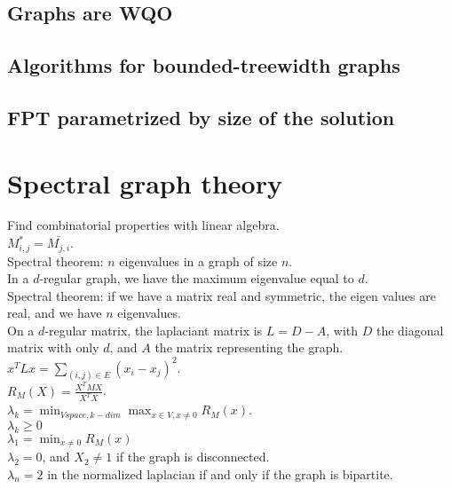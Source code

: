 \documentclass[12pt,a4paper]{article}
\begin{document}
\subsection{Graphs are WQO}
\subsection{Algorithms for bounded-treewidth graphs}
\subsection{FPT parametrized by size of the solution}


\section{Spectral graph theory}

Find combinatorial properties with linear algebra.\\

$M^*_{i,j} = \bar{M_{j,i}}$.\\

Spectral theorem: $n$ eigenvalues in a graph of size $n$.\\

In a $d$-regular graph, we have the maximum eigenvalue equal to $d$.\\

Spectral theorem: if we have a matrix real and symmetric, the eigen values are
real, and we have $n$ eigenvalues.\\

On a $d$-regular matrix, the laplaciant matrix is $L = D - A$, with $D$ the
diagonal matrix with only $d$, and $A$ the matrix representing the graph.\\

$x^TLx = \sum_{(i,j) \in E} (x_i - x_j)^2$.\\
$R_M(X) = \frac{X^TMX}{X^TX}$.\\
$\lambda_k = \min_{V space, k-dim}\max_{x \in V, x \neq 0}R_M(x)$.\\

$\lambda_k \geq 0$\\
$\lambda_1 = \min_{x \neq 0} R_M(x)$\\
$\lambda_2 = 0$, and $X_2 \neq 1$ if the graph is disconnected.\\

$\lambda_n = 2$ in the normalized laplacian if and only if the graph is
bipartite.\\
\end{document}
